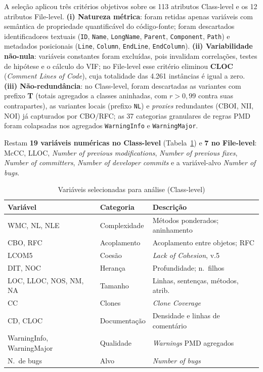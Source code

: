 \documentclass[conference]{IEEEtran}
\begin{document}
A seleção aplicou três critérios objetivos sobre os 113 atributos Class-level e os 12 atributos File-level. \textbf{(i) Natureza métrica}: foram retidas apenas variáveis com semântica de propriedade quantificável do código-fonte; foram descartados identificadores textuais (\texttt{ID}, \texttt{Name}, \texttt{LongName}, \texttt{Parent}, \texttt{Component}, \texttt{Path}) e metadados posicionais (\texttt{Line}, \texttt{Column}, \texttt{EndLine}, \texttt{EndColumn}). \textbf{(ii) Variabilidade não-nula}: variáveis constantes foram excluídas, pois invalidam correlações, testes de hipótese e o cálculo do VIF; no File-level esse critério eliminou \textbf{CLOC} (\textit{Comment Lines of Code}), cuja totalidade das 4.261 instâncias é igual a zero. \textbf{(iii) Não-redundância}: no Class-level, foram descartadas as variantes com prefixo \textbf{T} (totais agregados a classes aninhadas, com $r > 0{,}99$ contra suas contrapartes), as variantes locais (prefixo \texttt{NL}) e \textit{proxies} redundantes (CBOI, NII, NOI) já capturados por CBO/RFC; as 37 categorias granulares de regras PMD foram colapsadas nos agregados \texttt{WarningInfo} e \texttt{WarningMajor}.

Restam \textbf{19 variáveis numéricas no Class-level} (Tabela~\ref{tab:selecao}) e \textbf{7 no File-level}: McCC, LLOC, \textit{Number of previous modifications}, \textit{Number of previous fixes}, \textit{Number of committers}, \textit{Number of developer commits} e a variável-alvo \textit{Number of bugs}.

\begin{table}[htbp]
\caption{Variáveis selecionadas para análise (Class-level)}
\label{tab:selecao}
\centering
\scriptsize
\setlength{\tabcolsep}{3pt}
\renewcommand{\arraystretch}{1.15}
\begin{tabular}{@{}p{}p{}p{}@{}}
\toprule
\textbf{Variável} & \textbf{Categoria} & \textbf{Descrição} \\
\midrule
WMC, NL, NLE              & Complexidade  & Métodos ponderados; aninhamento \\
CBO, RFC                  & Acoplamento   & Acoplamento entre objetos; RFC \\
LCOM5                     & Coesão        & \textit{Lack of Cohesion}, v.5 \\
DIT, NOC                  & Herança       & Profundidade; n.\ filhos \\
LOC, LLOC, NOS, NM, NA    & Tamanho       & Linhas, sentenças, métodos, atrib. \\
CC                        & Clones        & \textit{Clone Coverage} \\
CD, CLOC                  & Documentação  & Densidade e linhas de comentário \\
WarningInfo, WarningMajor & Qualidade     & \textit{Warnings} PMD agregados \\
N.\ de bugs               & Alvo          & \textit{Number of bugs} \\
\bottomrule
\end{tabular}
\end{table}
\end{document}
